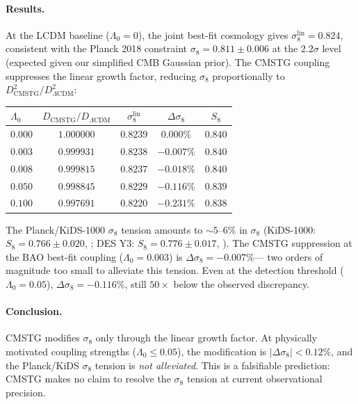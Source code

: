 \documentclass[12pt,a4paper]{article}
\begin{document}
\paragraph{Results.} At the LCDM baseline ($\Lambda_0=0$), the joint best-fit
cosmology gives $\sigma_8^{\mathrm{lin}} = 0.824$, consistent with the Planck
2018 constraint $\sigma_8 = 0.811 \pm 0.006$ \citep{Planck2020} at the
$2.2\sigma$ level (expected given our simplified CMB Gaussian prior). The
CMSTG coupling suppresses the linear growth factor, reducing $\sigma_8$
proportionally to $D_{\mathrm{CMSTG}}^2/D_{\Lambda\mathrm{CDM}}^2$:
\begin{center}
\begin{tabular}{lcccc}
\toprule
$\Lambda_0$ & $D_{\mathrm{CMSTG}}/D_{\Lambda\mathrm{CDM}}$ & $\sigma_8^{\mathrm{lin}}$
  & $\Delta\sigma_8$ & $S_8$ \\
\midrule
$0.000$ & $1.000000$ & $0.8239$ & $0.000\%$  & $0.840$ \\
$0.003$ & $0.999931$ & $0.8238$ & $-0.007\%$ & $0.840$ \\
$0.008$ & $0.999815$ & $0.8237$ & $-0.018\%$ & $0.840$ \\
$0.050$ & $0.998845$ & $0.8229$ & $-0.116\%$ & $0.839$ \\
$0.100$ & $0.997691$ & $0.8220$ & $-0.231\%$ & $0.838$ \\
\bottomrule
\end{tabular}
\end{center}
The Planck/KiDS-1000 $\sigma_8$ tension amounts to $\sim 5$--$6\%$ in $\sigma_8$
(KiDS-1000: $S_8 = 0.766 \pm 0.020$, \citealt{Asgari2021}; DES Y3:
$S_8 = 0.776 \pm 0.017$, \citealt{Abbott2022}). The CMSTG suppression at the
BAO best-fit coupling ($\Lambda_0 = 0.003$) is $\Delta\sigma_8 = -0.007\%$---
two orders of magnitude too small to alleviate this tension. Even at the
detection threshold ($\Lambda_0 = 0.05$), $\Delta\sigma_8 = -0.116\%$, still
$50\times$ below the observed discrepancy.

\paragraph{Conclusion.} CMSTG modifies $\sigma_8$ only through the linear growth
factor. At physically motivated coupling strengths ($\Lambda_0 \leq 0.05$), the
modification is $|\Delta\sigma_8| < 0.12\%$, and the Planck/KiDS $\sigma_8$
tension is \emph{not alleviated}. This is a falsifiable prediction: CMSTG makes
no claim to resolve the $\sigma_8$ tension at current observational precision.
\end{document}
